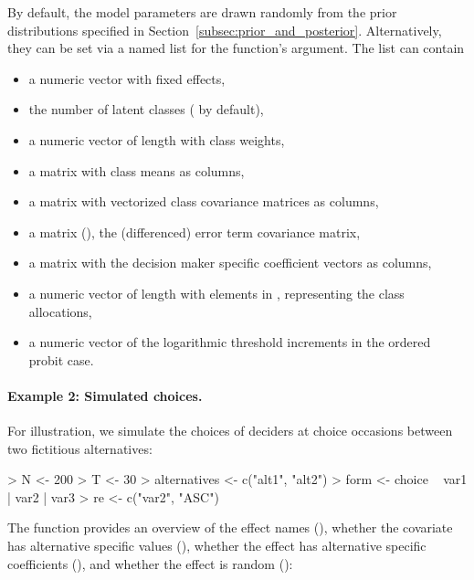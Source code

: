 \documentclass[article,shortnames]{jss}
\newcommand{\fct}[1]{\code{#1()}}
\begin{document}
By default, the model parameters are drawn randomly from the prior distributions specified in Section~\ref{subsec:prior_and_posterior}. Alternatively, they can be set via a named list for the function's  argument. The list can contain
\begin{itemize}
  \item a numeric vector  with fixed effects,
  \item the number  of latent classes ( by default),
  \item a numeric vector  of length  with class weights,
  \item a matrix  with class means as columns,
  \item a matrix  with vectorized class covariance matrices as columns,
  \item a matrix  (), the (differenced) error term covariance matrix,
  \item a matrix  with the decision maker specific coefficient vectors as columns,
  \item a numeric vector  of length  with elements in , representing the class allocations,
  \item a numeric vector  of the logarithmic threshold increments in the ordered probit case.
\end{itemize}

\paragraph{Example 2: Simulated choices.}

For illustration, we simulate the choices of  deciders at  choice occasions between two fictitious alternatives:

\begin{Schunk}
\begin{Sinput}
> N <- 200
> T <- 30
> alternatives <- c("alt1", "alt2")
> form <- choice ~ var1 | var2 | var3
> re <- c("var2", "ASC")
\end{Sinput}
\end{Schunk}

The \fct{overview\_effects} function provides an overview of the effect names (), whether the covariate has alternative specific values (), whether the effect has alternative specific coefficients (), and whether the effect is random ():
\end{document}
